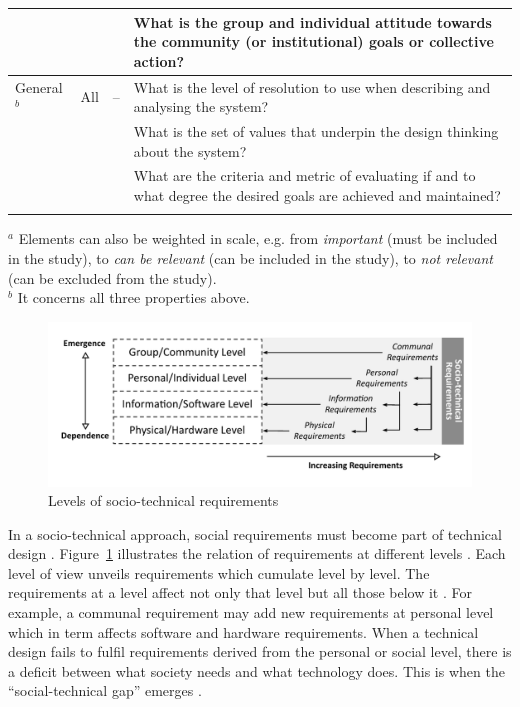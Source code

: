\begin{table}
\begin{tabular}{>{\raggedright}p{2cm}>{\raggedright}p{1.6cm}>{\raggedright}p{1.7cm}p{6.2cm}}
   &&& What is the group and individual attitude towards the community (or institutional) goals or collective action? \\ \hline\noalign{\smallskip}
General $^b$ & All  &  --  & What is the level of resolution to use when describing and analysing the system? \\
&&& What is the set of values that underpin the design thinking about the system? \\
&&& What are the criteria and metric of evaluating if and to what degree the desired goals are achieved and maintained? \\
\noalign{\smallskip}\hline\noalign{\smallskip}
\end{tabular}
$^a$ Elements can also be weighted in scale, e.g. from \textit{important} (must be included in the study), to \textit{can be relevant} (can be included in the study), to \textit{not relevant} (can be excluded from the study).\\
$^b$ It concerns all three properties above. 
\end{table}
%
%
\begin{figure}
\sidecaption
\includegraphics[scale=.68]{img/sts_requirements.pdf}
\caption{Levels of socio-technical requirements \cite{Whitworth2009a}}
\label{fig:sts_requirements} 
\end{figure}
% 
%
In a socio-technical approach, social requirements must become part of technical design \cite{Whitworth2014}. Figure~\ref{fig:sts_requirements} illustrates the relation of requirements at different levels \cite{Whitworth2009a}. Each level of view unveils requirements which cumulate level by level. The requirements at a level affect not only that level but all those below it \cite{Whitworth2009a}. For example, a communal requirement may add new requirements at personal level which in term affects software and hardware requirements. When a technical design fails to fulfil requirements derived from the personal or social level, there is a deficit  between  what  society  needs  and  what technology does. This is when the ``social-technical  gap''  emerges \cite{Whitworth2014}. 

